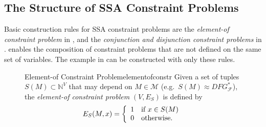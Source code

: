 \subsection{The Structure of SSA Constraint Problems}

    Basic construction rules for SSA constraint problems are the {\it element-of
    constraint problem} in ,
    and the {\it conjunction and disjunction constraint problems} in
    .
     enables the composition of constraint problems that are
    not defined on the same set of variables.
    The example in  can be constructed with only
    these rules.

\begin{figure}[p]
    \begin{definition}{Element-of Constraint Problem}{elementofconstr}
        Given a set of tuples $S(M)\subset\mathbb N^V$ that may depend on
        $M\in\mathcal M$ (e.g.\ $S(M)\approx DFG_\mathcal F^*$),
        the {\it element-of constraint problem} $(V,E_S)$ is defined by
        \begin{align*}
            E_S(M,x)=\left\{\begin{array}{l}
                                1\text{\quad if }x \in S(M)\\
                                0\text{\quad otherwise}.
                            \end{array}\right.
        \end{align*}
    \end{definition}


\end{figure}

